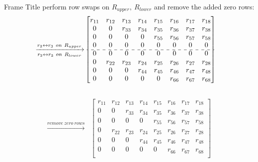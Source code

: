 \documentclass{beamer}
\begin{document}
\begin{frame}{Frame Title}
    perform row swaps on $R_{upper}, \ R_{lower}$ and remove the added zero rows:
    \begin{align*}
\xrightarrow[r_{2} \leftrightarrow r_{3}\ on\ R_{lower}]{r_{2} \leftrightarrow r_{3}\ on\ R_{upper}}
&\begin{bmatrix}
 r_{11} & r_{12} & r_{13} & r_{14} & r_{15} & r_{16} & r_{17} & r_{18}\\
 0      & 0      & r_{33} & r_{34} & r_{35} & r_{36} & r_{37} & r_{38}\\
 0      & 0      & 0      & 0      & r_{55} & r_{56} & r_{57} & r_{58}\\
 0      & 0      & 0      & 0      & 0      & 0      &  0     & 0     \\
\cdashline{1-8}
 0      & 0      & 0      & 0      & 0      & 0      & 0      & 0     \\
 0      & r_{22} & r_{23} & r_{24} & r_{25} & r_{26} & r_{27} & r_{28}\\
 0      & 0      & 0      & r_{44} & r_{45} & r_{46} & r_{47} & r_{48}\\
 0      & 0      & 0      & 0      & 0      & r_{66} & r_{67} & r_{68}\\
\end{bmatrix}
\end{align*}\\
\begin{align*}
\xrightarrow {remove\ zero\ rows}
&\begin{bmatrix}
 r_{11} & r_{12} & r_{13} & r_{14} & r_{15} & r_{16} & r_{17} & r_{18}\\
 0      & 0      & r_{33} & r_{34} & r_{35} & r_{36} & r_{37} & r_{38}\\
 0      & 0      & 0      & 0      & r_{55} & r_{56} & r_{57} & r_{58}\\
 0      & r_{22} & r_{23} & r_{24} & r_{25} & r_{26} & r_{27} & r_{28}\\
 0      & 0      & 0      & r_{44} & r_{45} & r_{46} & r_{47} & r_{48}\\
 0      & 0      & 0      & 0      & 0      & r_{66} & r_{67} & r_{68}\\
\end{bmatrix}
\end{align*}
\end{frame}
\end{document}
